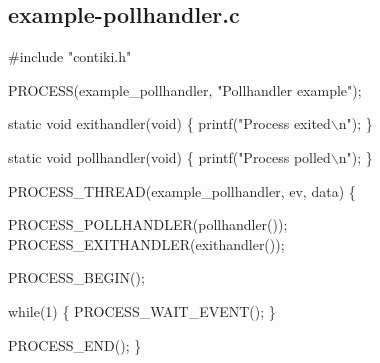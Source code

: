 \hypertarget{a00006}{}\subsection{example-\/pollhandler.\+c}

\begin{DoxyCodeInclude}
\textcolor{preprocessor}{#include "contiki.h"}

PROCESS(example\_pollhandler, \textcolor{stringliteral}{"Pollhandler example"});

\textcolor{keyword}{static} \textcolor{keywordtype}{void}
exithandler(\textcolor{keywordtype}{void})
\{
  printf(\textcolor{stringliteral}{"Process exited\(\backslash\)n"});
\}

\textcolor{keyword}{static} \textcolor{keywordtype}{void}
pollhandler(\textcolor{keywordtype}{void})
\{
  printf(\textcolor{stringliteral}{"Process polled\(\backslash\)n"});
\}

PROCESS\_THREAD(example\_pollhandler, ev, data)
\{
  
  PROCESS\_POLLHANDLER(pollhandler());
  PROCESS\_EXITHANDLER(exithandler());

  PROCESS\_BEGIN();

  \textcolor{keywordflow}{while}(1) \{
    PROCESS\_WAIT\_EVENT();
  \}
  
  PROCESS\_END();
\}
\end{DoxyCodeInclude}
 